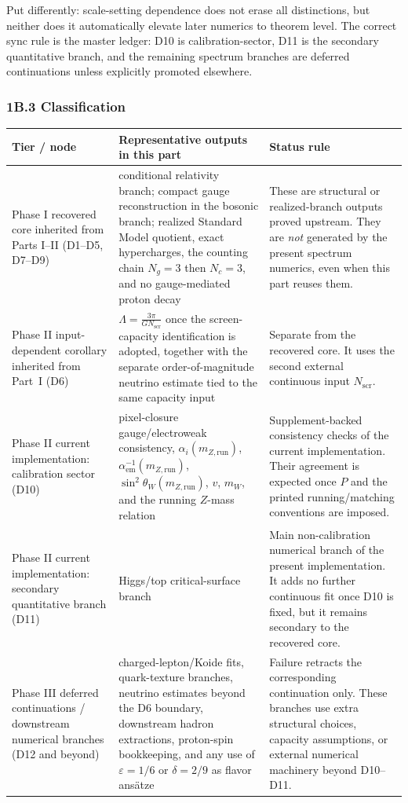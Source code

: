 Put differently: scale-setting dependence does not erase all distinctions, but neither does it automatically elevate later numerics to theorem level. The correct sync rule is the master ledger: D10 is calibration-sector, D11 is the secondary quantitative branch, and the remaining spectrum branches are deferred continuations unless explicitly promoted elsewhere.

\subsubsection{1B.3 Classification}\label{1b3-classification}

{\footnotesize
\def\LTcaptype{none}
\begin{longtable}[]{@{}>{\RaggedRight\arraybackslash}p{}>{\RaggedRight\arraybackslash}p{}>{\RaggedRight\arraybackslash}p{}@{}}
\toprule
Tier / node & Representative outputs in this part & Status rule \\
\midrule
\endhead
\bottomrule
\endfoot
Phase I recovered core inherited from Parts I--II (D1--D5, D7--D9) & conditional relativity branch; compact gauge reconstruction in the bosonic branch; realized Standard Model quotient, exact hypercharges, the counting chain \(N_g=3\) then \(N_c=3\), and no gauge-mediated proton decay & These are structural or realized-branch outputs proved upstream. They are \emph{not} generated by the present spectrum numerics, even when this part reuses them. \\
Phase II input-dependent corollary inherited from Part~I (D6) & \(\Lambda=\frac{3\pi}{G N_{\mathrm{scr}}}\) once the screen-capacity identification is adopted, together with the separate order-of-magnitude neutrino estimate tied to the same capacity input & Separate from the recovered core. It uses the second external continuous input \(N_{\mathrm{scr}}\). \\
Phase II current implementation: calibration sector (D10) & pixel-closure gauge/electroweak consistency, \(\alpha_i(m_{Z,\text{run}})\), \(\alpha_{\mathrm{em}}^{-1}(m_{Z,\text{run}})\), \(\sin^2\theta_W(m_{Z,\text{run}})\), \(v\), \(m_W\), and the running \(Z\)-mass relation & Supplement-backed consistency checks of the current implementation. Their agreement is expected once \(P\) and the printed running/matching conventions are imposed. \\
Phase II current implementation: secondary quantitative branch (D11) & Higgs/top critical-surface branch & Main non-calibration numerical branch of the present implementation. It adds no further continuous fit once D10 is fixed, but it remains secondary to the recovered core. \\
Phase III deferred continuations / downstream numerical branches (D12 and beyond) & charged-lepton/Koide fits, quark-texture branches, neutrino estimates beyond the D6 boundary, downstream hadron extractions, proton-spin bookkeeping, and any use of \(\varepsilon=1/6\) or \(\delta=2/9\) as flavor ans\"atze & Failure retracts the corresponding continuation only. These branches use extra structural choices, capacity assumptions, or external numerical machinery beyond D10--D11. \\
\end{longtable}
}

